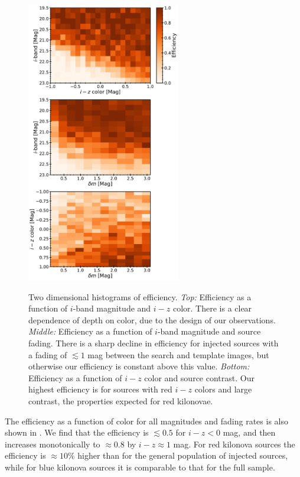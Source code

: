 \begin{figure}[!t]
\begin{center}
\hspace*{-0.1in}
\scalebox{1.}
{\includegraphics[width=0.6\textwidth]{./figs/chapter3/f7.pdf}}
\caption{Two dimensional histograms of efficiency. {\it Top:} Efficiency as a function of $i$-band magnitude and $i-z$ color. There is a clear dependence of depth on color, due to the design of our observations. {\it Middle:} Efficiency as a function of $i$-band magnitude and source fading. There is a sharp decline in efficiency for injected sources with a fading of $\lesssim 1$ mag between the search and template images, but otherwise our efficiency is constant above this value. {\it Bottom:} Efficiency as a function of $i-z$ color and source contrast. Our highest efficiency is for sources with red $i-z$ colors and large contrast, the properties expected for red kilonovae.}
\label{fig:ch3_eff_2D}
\end{center}
\end{figure}

The efficiency as a function of color for all magnitudes and fading rates is also shown in . We find that the efficiency is $\lesssim 0.5$ for $i-z<0$ mag, and then increases monotonically to $\approx 0.8$ by $i-z\approx 1$ mag. For red kilonova sources the efficiency is $\approx10\%$ higher than for the general population of injected sources, while for blue kilonova sources it is comparable to that for the full sample.

